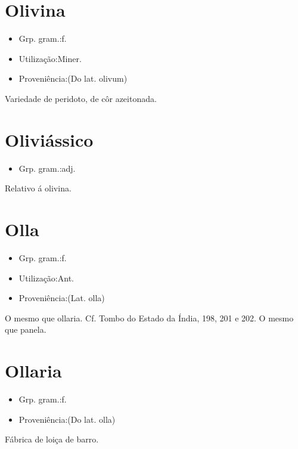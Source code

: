 \section{Olivina}
\begin{itemize}
\item {Grp. gram.:f.}
\end{itemize}
\begin{itemize}
\item {Utilização:Miner.}
\end{itemize}
\begin{itemize}
\item {Proveniência:(Do lat. \textunderscore olivum\textunderscore )}
\end{itemize}
Variedade de peridoto, de côr azeitonada.
\section{Oliviássico}
\begin{itemize}
\item {Grp. gram.:adj.}
\end{itemize}
Relativo á olivina.
\section{Olla}
\begin{itemize}
\item {Grp. gram.:f.}
\end{itemize}
\begin{itemize}
\item {Utilização:Ant.}
\end{itemize}
\begin{itemize}
\item {Proveniência:(Lat. \textunderscore olla\textunderscore )}
\end{itemize}
O mesmo que \textunderscore ollaria\textunderscore . Cf. \textunderscore Tombo do Estado da Índia\textunderscore , 198, 201 e 202.
O mesmo que \textunderscore panela\textunderscore .
\section{Ollaria}
\begin{itemize}
\item {Grp. gram.:f.}
\end{itemize}
\begin{itemize}
\item {Proveniência:(Do lat. \textunderscore olla\textunderscore )}
\end{itemize}
Fábrica de loiça de barro.
